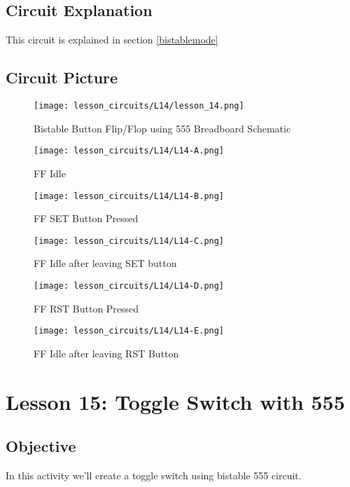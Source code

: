 \subsection{Circuit Explanation}
This circuit is explained in section \ref{bistablemode}
\subsection{Circuit Picture}
\begin{figure}[!htp]
    \centering
    \texttt{[image: lesson\_circuits/L14/lesson\_14.png]}
    \caption{Bistable Button Flip/Flop using 555 Breadboard Schematic}
    \label{fig:555_ff_sch}
\end{figure}
\begin{figure}[!htp]
    \centering
    \texttt{[image: lesson\_circuits/L14/L14-A.png]}
    \caption{FF Idle}
    \label{fig:555_ff_obb}
\end{figure}
\begin{figure}[!htp]
    \centering
    \texttt{[image: lesson\_circuits/L14/L14-B.png]}
    \caption{FF SET Button Pressed}
    \label{fig:555_ff_obb1}
\end{figure}
\begin{figure}[!htp]
    \centering
    \texttt{[image: lesson\_circuits/L14/L14-C.png]}
    \caption{FF Idle after leaving SET button}
    \label{fig:555_ff_obb2}
\end{figure}
\begin{figure}[!htp]
    \centering
    \texttt{[image: lesson\_circuits/L14/L14-D.png]}
    \caption{FF RST Button Pressed}
    \label{fig:555_ff_obb3}
\end{figure}
\begin{figure}[!htp]
    \centering
    \texttt{[image: lesson\_circuits/L14/L14-E.png]}
    \caption{FF Idle after leaving RST Button}
    \label{fig:555_ff_obb4}
\end{figure}
\section{Lesson 15: Toggle Switch with 555}
\subsection{Objective}
In this activity we'll create a toggle switch using bistable 555 circuit.
